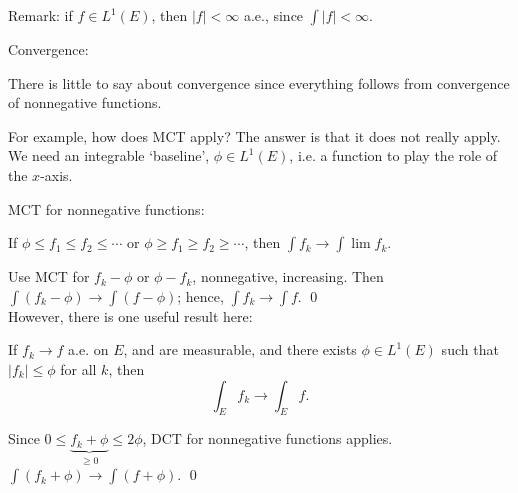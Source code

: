 Remark: if $f \in L^1(E)$, then $|f|<\infty$ a.e., since $\int |f|<\infty$. 




Convergence: 

There is little to say about convergence since everything follows from convergence of nonnegative functions. 


For example, how does MCT apply? The answer is that it does not really apply. We need an integrable `baseline', $\phi \in L^1(E)$, i.e. a function to play the role of the $x$-axis. 

MCT for nonnegative functions: 


If $\phi \leq f_1 \leq f_2 \leq \cdots$ or $\phi \geq f_1 \geq f_2 \geq \cdots$, then $\int f_k \to \int \lim f_k$. 

\pf Use MCT for $f_k - \phi$ or $\phi - f_k$, nonnegative, increasing. Then $\int (f_k - \phi) \to \int (f-\phi)$; hence, $\int f_k \to \int f$. \qed \\



However, there is one useful result here:

\begin{thm}
If $f_k \to f$ a.e. on $E$, and are measurable, and there exists $\phi \in L^1(E)$ such that $|f_k| \leq \phi$ for all $k$, then
	\[
	\int_E f_k \longrightarrow \int_E f.
	\]
\end{thm}


\pf Since $0 \leq \underbrace{f_k+\phi}_{\geq 0} \leq 2 \phi$, DCT for nonnegative functions applies. $\int (f_k+\phi) \to \int (f+\phi)$. \qed \\


